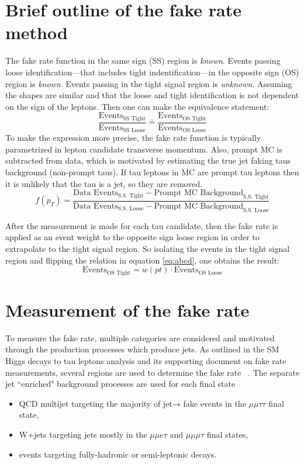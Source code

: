 \section{Brief outline of the fake rate method}
The fake rate function in the same sign (SS) region is \textit{known}.
Events passing loose identification---that includes tight indentification---in the opposite sign (OS) region is \textit{known}.
Events passing in the tight signal region is \textit{unknown}. 
Assuming the shapes are similar and that the loose and tight identification is not dependent on the sign of the leptons. Then one can make the equivalence statement: 
\begin{equation}
\label{eq:abcd}
\frac{\text{Events}_\text{SS Tight}}{\text{Events}_\text{SS Loose}} \doteq \frac{\text{Events}_\text{OS Tight}}{\text{Events}_\text{OS Loose}}
\end{equation}
To make the expression more precise, the fake rate function is typically parametrized in lepton candidate transverse momentum. 
 Also, prompt MC is subtracted from data, which is motivated by estimating the true jet faking taus background (non-prompt taus). If tau leptons in MC are prompt tau leptons then it is unlikely that the tau is a jet, so they are removed. 
\begin{equation}
f(p_T)=\frac{\text{Data Events}_\text{S.S. Tight} - \text{Prompt MC Background}_\text{S.S. Tight}}{{\text{Data Events}_\text{S.S. Loose} - \text{Prompt MC Background}_\text{S.S. Loose}}}
\end{equation} 

After the measurement is made for each tau candidate, then the fake rate is applied as an event weight to the opposite sign loose region in order to extrapolate to the tight signal region. So isolating the events in the tight signal region and flipping the relation in equation \ref{eq:abcd}, one obtains the result: 
\begin{equation}
\text{Events}_\text{OS Tight} = w(pt)\cdot \text{Events}_\text{OS Loose}  
\end{equation}

\section{Measurement of the fake rate}
To measure the fake rate, multiple categories are considered and motivated through the production processes which produce jets. As outlined in the SM Higgs decays to tau leptons analysis and its supporting document on fake rate measurements, several regions are used to determine the fake rate ~\cite{SMHTTarXiv}. The separate jet ``enriched" background processes are used for each final state
\begin{itemize}
	\item QCD multijet targeting the majority of jet→ \tauh fake events in the $\mu\mu\tau\tau$ final state,
	\item W+jets targeting jets mostly in the $\mu\mu e\tau$ and $\mu\mu\mu\tau$ final states,
	\item \ttbar events targeting fully-hadronic or semi-leptonic decays.
\end{itemize} 



